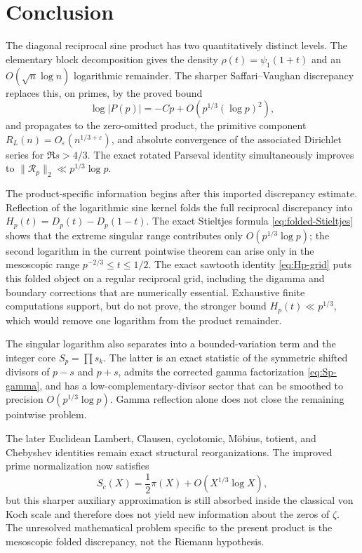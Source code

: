 \documentclass[11pt]{amsart}
\numberwithin{equation}{section}
\theoremstyle{definition}
\theoremstyle{remark}
\newcommand{\eps}{\varepsilon}
\begin{document}
\section{Conclusion}
\label{sec:conclusion}

The diagonal reciprocal sine product has two quantitatively distinct
levels.  The elementary block decomposition gives the density
\(\rho(t)=\psi_1(1+t)\) and an \(O(\sqrt n\log n)\) logarithmic remainder.
The sharper Saffari--Vaughan discrepancy replaces this, on primes, by the
proved bound
\[
 \log|P(p)|=-Cp+O(p^{1/3}(\log p)^2),
\]
and propagates to the zero-omitted product, the primitive component
\(R_L(n)=O_\eps(n^{1/3+\eps})\), and absolute convergence of the associated
Dirichlet series for \(\Re s>4/3\).  The exact rotated Parseval identity
simultaneously improves to
\(\|\mathscr R_p\|_2\ll p^{1/3}\log p\).

The product-specific information begins after this imported discrepancy
estimate.  Reflection of the logarithmic sine kernel folds the full
reciprocal discrepancy into \(H_p(t)=D_p(t)-D_p(1-t)\).  The exact
Stieltjes formula \eqref{eq:folded-Stieltjes} shows that the extreme
singular range contributes only \(O(p^{1/3}\log p)\); the second logarithm
in the current pointwise theorem can arise only in the mesoscopic range
\(p^{-2/3}\le t\le1/2\).  The exact sawtooth identity
\eqref{eq:Hp-grid} puts this folded object on a regular reciprocal grid,
including the digamma and boundary corrections that are numerically
essential.  Exhaustive finite computations support, but do not prove, the
stronger bound \(H_p(t)\ll p^{1/3}\), which would remove one logarithm from
the product remainder.

The singular logarithm also separates into a bounded-variation term and the
integer core \(S_p=\prod s_k\).  The latter is an exact statistic of the
symmetric shifted divisors of \(p-s\) and \(p+s\), admits the corrected
gamma factorization \eqref{eq:Sp-gamma}, and has a low-complementary-divisor
sector that can be smoothed to precision \(O(p^{1/3}\log p)\).  Gamma
reflection alone does not close the remaining pointwise problem.

The later Euclidean Lambert, Clausen, cyclotomic, M\"obius, totient, and
Chebyshev identities remain exact structural reorganizations.  The improved
prime normalization now satisfies
\[
 S_c(X)=\frac12\pi(X)+O(X^{1/3}\log X),
\]
but this sharper auxiliary approximation is still absorbed inside the
classical von Koch scale and therefore does not yield new information about
the zeros of \(\zeta\).  The unresolved mathematical problem specific to
the present product is the mesoscopic folded discrepancy, not the Riemann
hypothesis.
\end{document}
